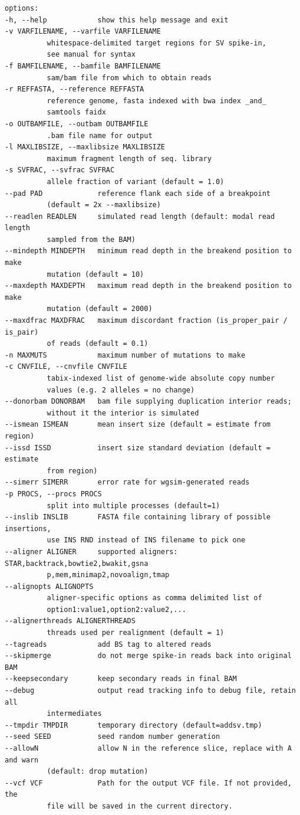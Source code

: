\documentclass[letterpaper,11pt]{article}
\begin{document}
\begin{verbatim}
options:
-h, --help            show this help message and exit
-v VARFILENAME, --varfile VARFILENAME
          whitespace-delimited target regions for SV spike-in,
          see manual for syntax
-f BAMFILENAME, --bamfile BAMFILENAME
          sam/bam file from which to obtain reads
-r REFFASTA, --reference REFFASTA
          reference genome, fasta indexed with bwa index _and_
          samtools faidx
-o OUTBAMFILE, --outbam OUTBAMFILE
          .bam file name for output
-l MAXLIBSIZE, --maxlibsize MAXLIBSIZE
          maximum fragment length of seq. library
-s SVFRAC, --svfrac SVFRAC
          allele fraction of variant (default = 1.0)
--pad PAD             reference flank each side of a breakpoint
          (default = 2x --maxlibsize)
--readlen READLEN     simulated read length (default: modal read length
          sampled from the BAM)
--mindepth MINDEPTH   minimum read depth in the breakend position to make
          mutation (default = 10)
--maxdepth MAXDEPTH   maximum read depth in the breakend position to make
          mutation (default = 2000)
--maxdfrac MAXDFRAC   maximum discordant fraction (is_proper_pair / is_pair)
          of reads (default = 0.1)
-n MAXMUTS            maximum number of mutations to make
-c CNVFILE, --cnvfile CNVFILE
          tabix-indexed list of genome-wide absolute copy number
          values (e.g. 2 alleles = no change)
--donorbam DONORBAM   bam file supplying duplication interior reads;
          without it the interior is simulated
--ismean ISMEAN       mean insert size (default = estimate from region)
--issd ISSD           insert size standard deviation (default = estimate
          from region)
--simerr SIMERR       error rate for wgsim-generated reads
-p PROCS, --procs PROCS
          split into multiple processes (default=1)
--inslib INSLIB       FASTA file containing library of possible insertions,
          use INS RND instead of INS filename to pick one
--aligner ALIGNER     supported aligners: STAR,backtrack,bowtie2,bwakit,gsna
          p,mem,minimap2,novoalign,tmap
--alignopts ALIGNOPTS
          aligner-specific options as comma delimited list of
          option1:value1,option2:value2,...
--alignerthreads ALIGNERTHREADS
          threads used per realignment (default = 1)
--tagreads            add BS tag to altered reads
--skipmerge           do not merge spike-in reads back into original BAM
--keepsecondary       keep secondary reads in final BAM
--debug               output read tracking info to debug file, retain all
          intermediates
--tmpdir TMPDIR       temporary directory (default=addsv.tmp)
--seed SEED           seed random number generation
--allowN              allow N in the reference slice, replace with A and warn
          (default: drop mutation)
--vcf VCF             Path for the output VCF file. If not provided, the
          file will be saved in the current directory.
  
\end{verbatim}
\end{document}
